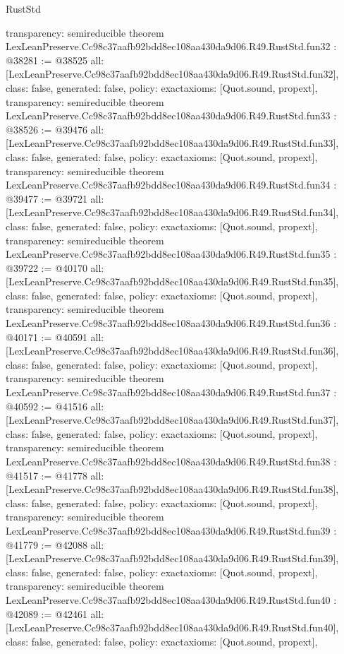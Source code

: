 \begin{lexlean}{RustStd}
\begin{coremodule}
{  transparency: semireducible
}
theorem LexLeanPreserve.Cc98c37aafb92bdd8ec108aa430da9d06.R49.RustStd.fun32 : @38281 := @38525 {
  all: [LexLeanPreserve.Cc98c37aafb92bdd8ec108aa430da9d06.R49.RustStd.fun32],
  class: false,
  generated: false,
  policy: exact{axioms: [Quot.sound, propext]},
  transparency: semireducible
}
theorem LexLeanPreserve.Cc98c37aafb92bdd8ec108aa430da9d06.R49.RustStd.fun33 : @38526 := @39476 {
  all: [LexLeanPreserve.Cc98c37aafb92bdd8ec108aa430da9d06.R49.RustStd.fun33],
  class: false,
  generated: false,
  policy: exact{axioms: [Quot.sound, propext]},
  transparency: semireducible
}
theorem LexLeanPreserve.Cc98c37aafb92bdd8ec108aa430da9d06.R49.RustStd.fun34 : @39477 := @39721 {
  all: [LexLeanPreserve.Cc98c37aafb92bdd8ec108aa430da9d06.R49.RustStd.fun34],
  class: false,
  generated: false,
  policy: exact{axioms: [Quot.sound, propext]},
  transparency: semireducible
}
theorem LexLeanPreserve.Cc98c37aafb92bdd8ec108aa430da9d06.R49.RustStd.fun35 : @39722 := @40170 {
  all: [LexLeanPreserve.Cc98c37aafb92bdd8ec108aa430da9d06.R49.RustStd.fun35],
  class: false,
  generated: false,
  policy: exact{axioms: [Quot.sound, propext]},
  transparency: semireducible
}
theorem LexLeanPreserve.Cc98c37aafb92bdd8ec108aa430da9d06.R49.RustStd.fun36 : @40171 := @40591 {
  all: [LexLeanPreserve.Cc98c37aafb92bdd8ec108aa430da9d06.R49.RustStd.fun36],
  class: false,
  generated: false,
  policy: exact{axioms: [Quot.sound, propext]},
  transparency: semireducible
}
theorem LexLeanPreserve.Cc98c37aafb92bdd8ec108aa430da9d06.R49.RustStd.fun37 : @40592 := @41516 {
  all: [LexLeanPreserve.Cc98c37aafb92bdd8ec108aa430da9d06.R49.RustStd.fun37],
  class: false,
  generated: false,
  policy: exact{axioms: [Quot.sound, propext]},
  transparency: semireducible
}
theorem LexLeanPreserve.Cc98c37aafb92bdd8ec108aa430da9d06.R49.RustStd.fun38 : @41517 := @41778 {
  all: [LexLeanPreserve.Cc98c37aafb92bdd8ec108aa430da9d06.R49.RustStd.fun38],
  class: false,
  generated: false,
  policy: exact{axioms: [Quot.sound, propext]},
  transparency: semireducible
}
theorem LexLeanPreserve.Cc98c37aafb92bdd8ec108aa430da9d06.R49.RustStd.fun39 : @41779 := @42088 {
  all: [LexLeanPreserve.Cc98c37aafb92bdd8ec108aa430da9d06.R49.RustStd.fun39],
  class: false,
  generated: false,
  policy: exact{axioms: [Quot.sound, propext]},
  transparency: semireducible
}
theorem LexLeanPreserve.Cc98c37aafb92bdd8ec108aa430da9d06.R49.RustStd.fun40 : @42089 := @42461 {
  all: [LexLeanPreserve.Cc98c37aafb92bdd8ec108aa430da9d06.R49.RustStd.fun40],
  class: false,
  generated: false,
  policy: exact{axioms: [Quot.sound, propext]},
}
\end{coremodule}
\end{lexlean}
